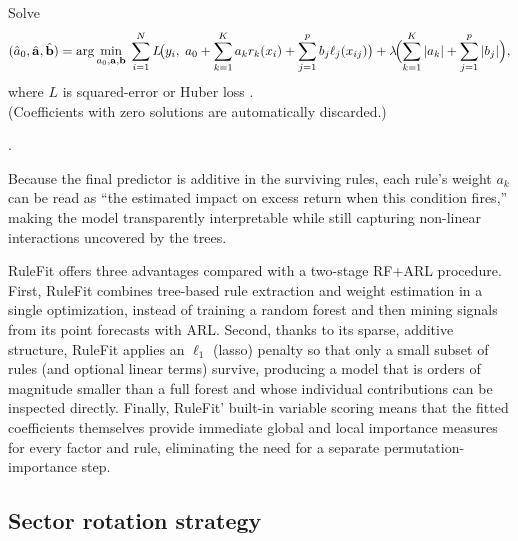 \begin{algorithm}[H]
        \BlankLine
    
        \BlankLine
        Solve
        \[
          (\hat{a}_0,\hat{\mathbf{a}},\hat{\mathbf{b}})=
          \arg\min_{a_0,\mathbf{a},\mathbf{b}}\;
            \sum_{i=1}^{N}L\!\bigl(y_i,\;
              a_0+\sum_{k=1}^{K}a_k r_k(x_i)+\sum_{j=1}^{p}b_j \ell_j(x_{ij})\bigr)
            +\lambda\!\Bigl(\sum_{k=1}^{K}|a_k|+\sum_{j=1}^{p}|b_j|\Bigr),
        \]
        where $L$ is squared-error or Huber loss \cite{friedman_popescu_2008}.  \\
        (Coefficients with zero solutions are automatically discarded.)
    
        \BlankLine
        .
    \end{algorithm}
    
    
Because the final predictor is additive in the surviving rules, each rule's weight $a_{k}$ can be read as “the estimated impact on excess return when this condition fires,” making the model transparently interpretable while still capturing non-linear interactions uncovered by the trees.

RuleFit offers three advantages compared with a two-stage RF+ARL procedure. First, RuleFit combines tree-based rule extraction and weight estimation in a single optimization, instead of training a random forest and then mining signals from its point forecasts with ARL. Second, thanks to its sparse, additive structure, RuleFit applies an $\ell_{1}$ (lasso) penalty so that only a small subset of rules (and optional linear terms) survive, producing a model that is orders of magnitude smaller than a full forest and whose individual contributions can be inspected directly. Finally, RuleFit' built-in variable scoring means that the fitted coefficients themselves provide immediate global and local importance measures for every factor and rule, eliminating the need for a separate permutation-importance step.


\subsection{Sector rotation strategy}

